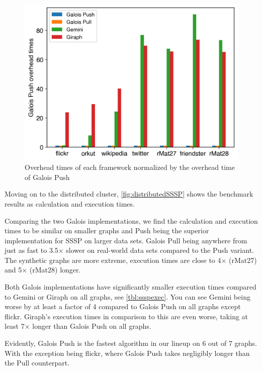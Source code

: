 \begin{figure}
	\centering
	\includegraphics[width=\linewidth]{../../plots/distributedSSSP_overheadTimeNormalizedToGalois.png}
	\caption{Overhead times of each framework normalized by the overhead time of Galois Push}
	\label{fig:distributedSSSP_overhead}
\end{figure}

Moving on to the distributed cluster, \autoref{fig:distributedSSSP} shows the benchmark results as calculation and execution times. 

Comparing the two Galois implementations, we find the calculation and execution times to be similar on smaller graphs and Push being the superior implementation for SSSP on larger data sets. Galois Pull being anywhere from just as fast to 3.5$\times$ slower on real-world data sets compared to the Push variant. The synthetic graphs are more extreme, execution times are close to 4$\times$ (rMat27) and 5$\times$ (rMat28) longer.

Both Galois implementations have significantly smaller execution times compared to Gemini or Giraph on all graphs, see \autoref{tbl:ssspexec}.
You can see Gemini being worse by at least a factor of 4 compared to Galois Push on all graphs except flickr.
Giraph's execution times in comparison to this are even worse, taking at least 7$\times$ longer than Galois Push on all graphs.

Evidently, Galois Push is the fastest algorithm in our lineup on 6 out of 7 graphs. With the exception being flickr, where Galois Push takes negligibly longer than the Pull counterpart. 



